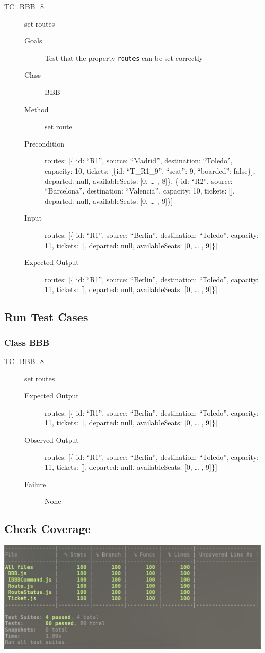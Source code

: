 \documentclass[11pt]{article}
\begin{document}
\begin{description}
\item[{TC\_BBB\_8}] set routes
\begin{description}
\item[{Goals}] Test that the property \texttt{routes} can be set correctly
\item[{Class}] BBB
\item[{Method}] set route
\item[{Precondition}] routes: [\{ id: “R1”, source: “Madrid”, destination: “Toledo”, capacity: 10,  tickets: [\{id: “T\_R1\_9”, “seat”: 9, “boarded”: false\}], departed: null, availableSeats: [0, … , 8]\},
\{ id: “R2”, source: “Barcelona”, destination: “Valencia”, capacity: 10,  tickets: [], departed: null, availableSeats: [0, … , 9]\}]
\item[{Input}] routes: [\{ id: “R1”, source: “Berlin”, destination: “Toledo”, capacity: 11,  tickets: [], departed: null, availableSeats: [0, … , 9]\}]
\item[{Expected Output}] routes: [\{ id: “R1”, source: “Berlin”, destination: “Toledo”, capacity: 11,  tickets: [], departed: null, availableSeats: [0, … , 9]\}]
\end{description}
\end{description}

\subsection{Run Test Cases}
\label{sec:org5629eef}

\subsubsection{Class BBB}
\label{sec:orga546ba5}

\begin{description}
\item[{TC\_BBB\_8}] set routes
\begin{description}
\item[{Expected Output}] routes: [\{ id: “R1”, source: “Berlin”, destination: “Toledo”, capacity: 11,  tickets: [], departed: null, availableSeats: [0, … , 9]\}]
\item[{Observed Output}] routes: [\{ id: “R1”, source: “Berlin”, destination: “Toledo”, capacity: 11,  tickets: [], departed: null, availableSeats: [0, … , 9]\}]
\item[{Failure}] None
\end{description}
\end{description}

\subsection{Check Coverage}
\label{sec:org7c2e94f}

\begin{center}
\includegraphics[width=.9\linewidth]{documentation.org.img/org_20181130_185109_LYvGqi.jpg}
\end{center}
\end{document}
